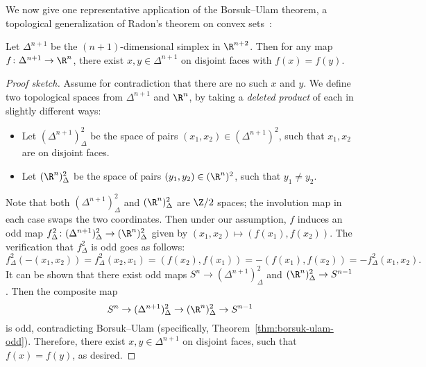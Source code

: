 \documentclass[11pt, reqno, english]{amsart}
\begin{document}
We now give one representative application of the Borsuk--Ulam theorem, a topological generalization of Radon's theorem on convex sets~\cite{radon1921mengen}:

\begin{theorem}\label{thm:bajmoczy-barany}
Let $\Delta^{n + 1}$ be the $(n + 1)$-dimensional simplex in $\R^{n + 2}$.
Then for any map $f \colon \Delta^{n + 1} \to \R^{n}$, there exist $x, y \in \Delta^{n + 1}$ on disjoint faces with $f(x) = f(y)$.
\end{theorem}

\begin{proof}[Proof sketch]
Assume for contradiction that there are no such $x$ and $y$.
We define two topological spaces from $\Delta^{n + 1}$ and $\R^{n}$, by taking a \emph{deleted product} of each in slightly different ways:
\begin{itemize}
\item Let $(\Delta^{n + 1})^{2}_{\Delta}$ be the space of pairs $(x_{1}, x_{2}) \in (\Delta^{n + 1})^{2}$, such that $x_{1}, x_{2}$ are on disjoint faces.
\item Let $(\R^{n})^{2}_{\Delta}$ be the space of pairs $(y_{1}, y_{2}) \in (\R^{n})^{2}$, such that $y_{1} \ne y_{2}$.
\end{itemize}
Note that both $(\Delta^{n + 1})^{2}_{\Delta}$ and $(\R^{n})^{2}_{\Delta}$ are $\Z/2$ spaces; the involution map in each case swaps the two coordinates.
Then under our assumption, $f$ induces an odd map $f^{2}_{\Delta} \colon (\Delta^{n + 1})^{2}_{\Delta} \to (\R^{n})^{2}_{\Delta}$ given by $(x_{1}, x_{2}) \mapsto (f(x_{1}), f(x_{2}))$.
The verification that $f^{2}_{\Delta}$ is odd goes as follows:
\begin{equation*}
f^{2}_{\Delta}(-(x_{1}, x_{2})) = f^{2}_{\Delta}(x_{2}, x_{1}) = (f(x_{2}), f(x_{1})) = -(f(x_{1}), f(x_{2})) = -f^{2}_{\Delta}(x_{1}, x_{2}).
\end{equation*}
It can be shown that there exist odd maps $S^{n} \to (\Delta^{n + 1})^{2}_{\Delta}$ and $(\R^{n})^{2}_{\Delta} \to S^{n - 1}$.
Then the composite map
\[ S^{n} \to (\Delta^{n + 1})^{2}_{\Delta} \to (\R^{n})^{2}_{\Delta} \to S^{n - 1} \]
is odd, contradicting Borsuk--Ulam (specifically, Theorem~\ref{thm:borsuk-ulam-odd}).
Therefore, there exist $x, y \in \Delta^{n + 1}$ on disjoint faces, such that $f(x) = f(y)$, as desired.
\end{proof}
\end{document}
